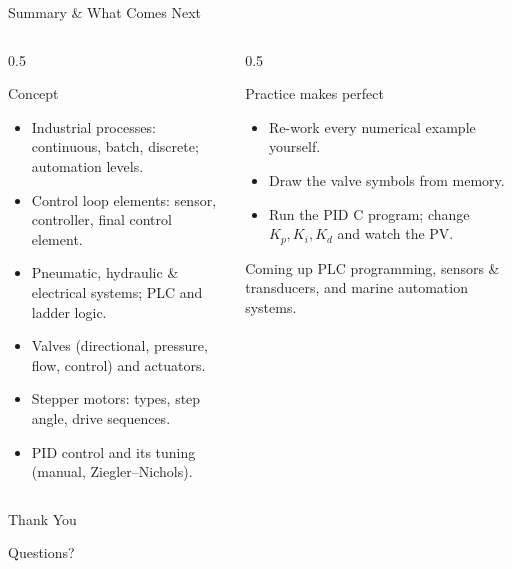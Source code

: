 \documentclass[aspectratio=169]{beamer}
\begin{document}
	\begin{frame}{Summary \& What Comes Next}
		\begin{columns}[T]
			\begin{column}{0.5\textwidth}
				\begin{block}{Concept}
					\begin{itemize}\small
						\item Industrial processes: continuous, batch, discrete; automation levels.
						\item Control loop elements: sensor, controller, final control element.
						\item Pneumatic, hydraulic \& electrical systems; PLC and ladder logic.
						\item Valves (directional, pressure, flow, control) and actuators.
						\item Stepper motors: types, step angle, drive sequences.
						\item PID control and its tuning (manual, Ziegler--Nichols).
					\end{itemize}
				\end{block}
			\end{column}
			\begin{column}{0.5\textwidth}
				\begin{block}{Practice makes perfect}
					\begin{itemize}\small
						\item Re-work every numerical example yourself.
						\item Draw the valve symbols from memory.
						\item Run the PID C program; change $K_p, K_i, K_d$ and watch the PV.
					\end{itemize}
				\end{block}
				\begin{block}{Coming up}
					\small PLC programming, sensors \& transducers, and marine automation systems.
				\end{block}
			\end{column}
		\end{columns}
	\end{frame}

	\begin{frame}
		\centering
		\Huge Thank You
		\vspace{0.5cm}

		\normalsize Questions?
	\end{frame}

\end{document}

